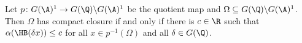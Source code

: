 Let $p\colon G(\A)^1\to G(\Q)\backslash G(\A)^1$ be the quotient map and $\Omega\subseteq G(\Q)\backslash G(\A)^1$. Then
$\Omega$ has compact closure if and only if there is $c\in\R$ such that $\alpha(\HB(\delta x))\le c$ for all
$x\in p^{-1}(\Omega)$ and all $\delta\in G(\Q)$.
